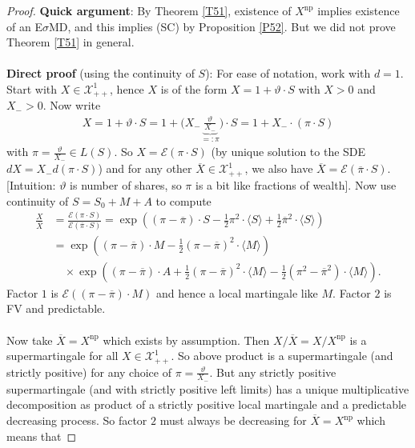 \documentclass[12pt,a4paper, twoside]{article}
\theoremstyle{definition}
\begin{document}
\begin{proof}
\textbf{Quick argument}: By Theorem \ref{T51}, existence of $X^\text{np}$ implies existence of an E$\sigma$MD, and this implies (SC) by Proposition \ref{P52}. But we did not prove Theorem \ref{T51} in general. 
\\\\
\textbf{Direct proof} (using the continuity of $S$): For ease of notation, work with $d=1$. Start with $X \in \mathcal{X}_{++}^1$, hence $X$ is of the form $X=1 + \vartheta \cdot S$ with $X>0$ and $X_->0$. Now write 
\begin{align*}
X = 1 + \vartheta \cdot S = 1+ \Big( X_- \underbrace{\frac{\vartheta}{X_-}}_{=: \pi} \Big)  \cdot S = 1 + X_- \cdot (\pi \cdot S)
\end{align*}
with $\pi = \frac{\vartheta}{X_-} \in L(S)$. So $X = \mathcal{E}( \pi \cdot S)$ (by unique solution to the SDE $dX=X_- d( \pi \cdot S)$) and for any other $\overline{X} \in \mathcal{X}_{++}^1$, we also have $\overline{X}= \mathcal{E}( \overline{\pi} \cdot S)$. [Intuition: $\vartheta$ is number of shares, so $\pi$ is a bit like fractions of wealth]. 
\newpage
Now use continuity of $S=S_0 + M + A$ to compute \begin{align*}
\frac{X}{\overline{X}}& = \frac{\mathcal{E}( \pi \cdot S)}{\mathcal{E}( \overline{\pi}\cdot S)} = \exp \left( ( \pi - \overline{\pi}) \cdot S- \frac{1}{2}\pi^2 \cdot \langle S \rangle + \frac{1}{2} \overline{\pi}^2 \cdot \langle S \rangle \right) \\
& = \exp \left(  ( \pi- \overline{\pi}) \cdot M - \frac{1}{2}( \pi- \overline{\pi})^2 \cdot \langle M \rangle \right) \\ & \quad \times \exp \left( ( \pi- \overline{\pi}) \cdot A + \frac{1}{2}( \pi- \overline{\pi})^2 \cdot \langle M \rangle - \frac{1}{2}( \pi^2- \overline{\pi}^2) \cdot \langle M \rangle \right).
\end{align*}
Factor $1$ is $\mathcal{E}(( \pi - \overline{\pi}) \cdot M )$ and hence a local martingale like $M$. Factor $2$ is FV and predictable. \\
\\
Now take $\overline{X}= X^\text{np}$ which exists by assumption. Then $X/\overline{X}= X/X^\text{np}$ is a supermartingale for all $X \in \mathcal{X}_{++}^1$. So above product is a supermartingale (and strictly positive) for any choice of $\pi = \frac{\vartheta}{X_-}$. But any strictly positive supermartingale (and with strictly positive left limits) has a unique multiplicative decomposition as product of a strictly positive local martingale and a predictable decreasing process. So factor $2$ must always be decreasing for $\overline{X}= X^\text{np}$ which means that

\end{proof}
\end{document}
